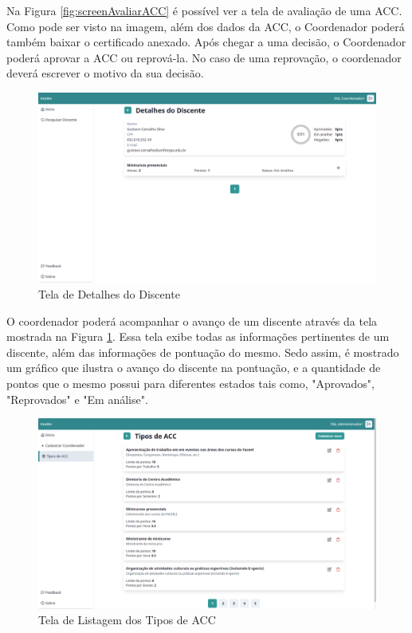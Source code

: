 Na Figura \ref{fig:screenAvaliarACC} é possível ver a tela de avaliação de uma ACC. Como pode ser visto na imagem, além dos dados da ACC, o Coordenador poderá também baixar o certificado anexado. Após chegar a uma decisão, o Coordenador poderá aprovar a ACC ou reprová-la. No caso de uma reprovação, o coordenador deverá escrever o motivo da sua decisão.

\begin{figure}[H]
    \centering
    \includegraphics[width=\textwidth]{dados/figuras/Proposta/Screens/coordinator_student_details.png}
    \caption{Tela de Detalhes do Discente}
    \label{fig:screenDetalhesDoDiscente}
\end{figure}

O coordenador poderá acompanhar o avanço de um discente através da tela mostrada na Figura \ref{fig:screenDetalhesDoDiscente}. Essa tela exibe todas as informações pertinentes de um discente, além das informações de pontuação do mesmo. Sedo assim, é mostrado um gráfico que ilustra o avanço do discente na pontuação, e a quantidade de pontos que o mesmo possui para diferentes estados tais como, "Aprovados", "Reprovados" e "Em análise".

\begin{figure}[H]
    \centering
    \includegraphics[width=\textwidth]{dados/figuras/Proposta/Screens/admin_acc_types.png}
    \caption{Tela de Listagem dos Tipos de ACC}
    \label{fig:screenListagemTiposDeACC}
\end{figure}

